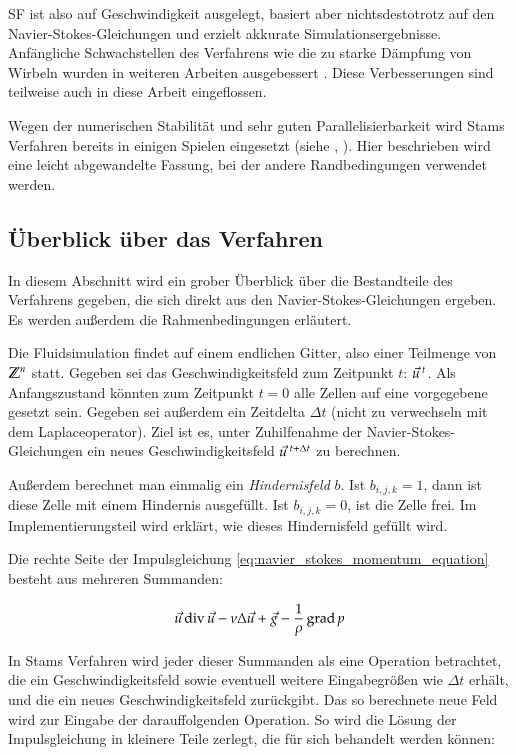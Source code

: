 SF ist also auf Geschwindigkeit ausgelegt, basiert aber
nichtsdestotrotz auf den Navier-Stokes-Gleichungen und erzielt
akkurate Simulationsergebnisse. Anfängliche Schwachstellen des
Verfahrens wie die zu starke Dämpfung von Wirbeln wurden in weiteren
Arbeiten ausgebessert \cite{Foster}. Diese Verbesserungen sind
teilweise auch in diese Arbeit eingeflossen.

Wegen der numerischen Stabilität und sehr guten Parallelisierbarkeit
wird Stams Verfahren bereits in einigen Spielen eingesetzt (siehe
\cite{Crane2007}, \cite{Peschel2009}). Hier beschrieben wird eine
leicht abgewandelte Fassung, bei der andere Randbedingungen verwendet
werden.

\subsection{Überblick über das Verfahren}

In diesem Abschnitt wird ein grober Überblick über die Bestandteile
des Verfahrens gegeben, die sich direkt aus den
Navier-Stokes-Gleichungen ergeben. Es werden außerdem die
Rahmenbedingungen erläutert.

Die Fluidsimulation findet auf einem endlichen Gitter, also einer
Teilmenge von $\mathbb{Z}^n$ statt. Gegeben sei das
Geschwindigkeitsfeld zum Zeitpunkt $t$:
$\vec{u}^{\textnormal{ }t}$. Als Anfangszustand
könnten zum Zeitpunkt $t=0$ \PimiddyzB alle Zellen auf eine vorgegebene
 gesetzt sein.  Gegeben sei außerdem ein
Zeitdelta $\Delta t$ (nicht zu verwechseln mit dem
Laplaceoperator). Ziel ist es, unter Zuhilfenahme der
Navier-Stokes-Gleichungen ein neues Geschwindigkeitsfeld
$\vec{u}^{\textnormal{ }t+\Delta t}$ zu berechnen.

Außerdem berechnet man einmalig ein \emph{Hindernisfeld}
$b$. Ist $b_{i,j,k} = 1$, dann ist diese Zelle mit einem
Hindernis ausgefüllt. Ist $b_{i,j,k} = 0$, ist die Zelle frei. Im
Implementierungsteil wird erklärt, wie dieses Hindernisfeld gefüllt
wird.

Die rechte Seite der Impulsgleichung \ref{eq:navier_stokes_momentum_equation} besteht
aus mehreren Summanden:

\begin{equation}
\vec{u} \operatorname*{div} \vec{u} -
\nu \Delta \vec{u} +
\vec{g} -
\frac{
	1
}
{
	\rho
}
\operatorname*{grad} p
\end{equation}

In Stams Verfahren wird jeder dieser Summanden als eine Operation betrachtet,
die ein Geschwindigkeitsfeld sowie eventuell weitere Eingabegrößen wie $\Delta
t$ erhält, und die ein neues Geschwindigkeitsfeld zurückgibt. Das so berechnete
neue Feld wird zur Eingabe der darauffolgenden Operation. So wird die Lösung der
Impulsgleichung in kleinere Teile zerlegt, die für sich behandelt werden können:

